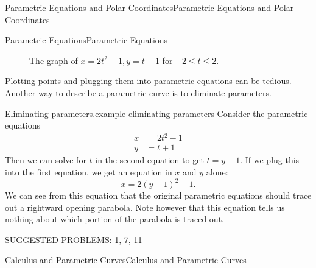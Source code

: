 \documentclass[10pt,]{book}
\numberwithin{equation}{section}
\begin{document}
\begin{chapterptx}{Parametric Equations and Polar Coordinates}{}{Parametric Equations and Polar Coordinates}{}{}
\begin{sectionptx}{Parametric Equations}{}{Parametric Equations}{}{}
\begin{figure}
{
}
\caption{The graph of \(x = 2t^2-1, y=t+1\) for \(-2\leq t\leq 2\).\label{figure-parametric-parabola}}
\end{figure}
\hypertarget{p-780}{}%
Plotting points and plugging them into parametric equations can be tedious. Another way to describe a parametric curve is to eliminate parameters.%
\begin{example}{Eliminating parameters.}{example-eliminating-parameters}%
\hypertarget{p-781}{}%
Consider the parametric equations%
%
\begin{align*}
x & = 2t^{2}-1 \\
y & = t+1 
\end{align*}
\hypertarget{p-782}{}%
Then we can solve for \(t\) in the second equation to get \(t = y-1\). If we plug this into the first equation, we get an equation in \(x\) and \(y\) alone:%
%
\begin{equation*}
x = 2(y-1)^{2}-1.
\end{equation*}
\hypertarget{p-783}{}%
We can see from this equation that the original parametric equations should trace out a rightward opening parabola. Note however that this equation tells us nothing about which portion of the parabola is traced out.%
\end{example}
\hypertarget{p-784}{}%
SUGGESTED PROBLEMS: 1, 7, 11%
\end{sectionptx}
%
%
\typeout{************************************************}
\typeout{************************************************}
%
\begin{sectionptx}{Calculus and Parametric Curves}{}{Calculus and Parametric Curves}{}{}\label{section-calculus-and-parametric-curves}

\end{sectionptx}
\end{chapterptx}
\end{document}
